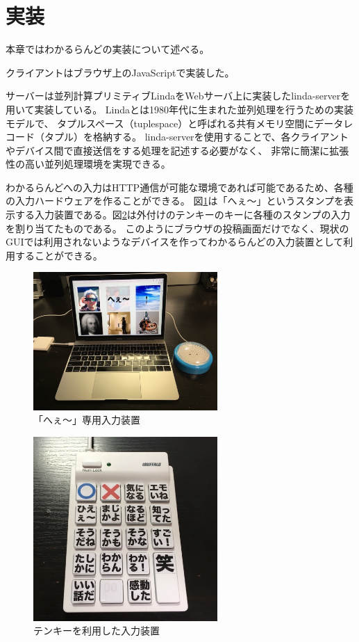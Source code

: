 \section{実装}

本章ではわかるらんどの実装について述べる。

クライアントはブラウザ上のJavaScriptで実装した。

サーバーは並列計算プリミティブLindaをWebサーバ上に実装したlinda-serverを用いて実装している。
Lindaとは1980年代に生まれた並列処理を行うための実装モデルで、
タプルスペース（tuplespace）と呼ばれる共有メモリ空間にデータレコード（タプル）を格納する。
linda-serverを使用することで、各クライアントやデバイス間で直接送信をする処理を記述する必要がなく、
非常に簡潔に拡張性の高い並列処理環境を実現できる。

わかるらんどへの入力はHTTP通信が可能な環境であれば可能であるため、各種の入力ハードウェアを作ることができる。
図\ref{button}は「へぇ〜」というスタンプを表示する入力装置である。図\ref{10key}は外付けのテンキーのキーに各種のスタンプの入力を割り当てたものである。
このようにブラウザの投稿画面だけでなく、現状のGUIでは利用されないようなデバイスを作ってわかるらんどの入力装置として利用することができる。

\begin{figure}[h]
\centering
\includegraphics[width=7cm]{images/button.eps}
\caption{「へぇ〜」専用入力装置}
\label{button}
\end{figure}

\begin{figure}[h]
\centering
\includegraphics[width=7cm]{images/10key.eps}
\caption{テンキーを利用した入力装置}
\label{10key}
\end{figure}